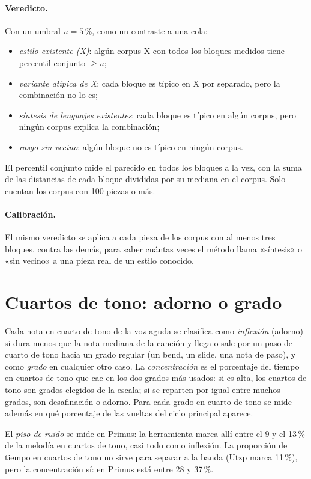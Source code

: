 \paragraph{Veredicto.} Con un umbral $u = 5$\,\%, como un contraste a una cola:
\begin{itemize}
  \item \emph{estilo existente (X)}: algún corpus X con todos los bloques medidos tiene percentil conjunto $\ge u$;
  \item \emph{variante atípica de X}: cada bloque es típico en X por separado, pero la combinación no lo es;
  \item \emph{síntesis de lenguajes existentes}: cada bloque es típico en algún corpus, pero ningún corpus explica la
  combinación;
  \item \emph{rasgo sin vecino}: algún bloque no es típico en ningún corpus.
\end{itemize}
El percentil conjunto mide el parecido en todos los bloques a la vez, con la suma de las distancias de cada bloque
divididas por su mediana en el corpus. Solo cuentan los corpus con 100 piezas o más.

\paragraph{Calibración.} El mismo veredicto se aplica a cada pieza de los corpus con al menos tres bloques, contra las
demás, para saber cuántas veces el método llama «síntesis» o «sin vecino» a una pieza real de un estilo conocido.

\section{Cuartos de tono: adorno o grado}\label{sec:metodo-cuartos}

Cada nota en cuarto de tono de la voz aguda se clasifica como \emph{inflexión} (adorno) si dura menos que la nota mediana
de la canción y llega o sale por un paso de cuarto de tono hacia un grado regular (un bend, un slide, una nota de paso), y
como \emph{grado} en cualquier otro caso. La \emph{concentración} es el porcentaje del tiempo en cuartos de tono que cae
en los dos grados más usados: si es alta, los cuartos de tono son grados elegidos de la escala; si se reparten por igual
entre muchos grados, son desafinación o adorno. Para cada grado en cuarto de tono se mide además en qué porcentaje de las
vueltas del ciclo principal aparece.

El \emph{piso de ruido} se mide en Primus: la herramienta marca allí entre el 9 y el 13\,\% de la melodía en cuartos de
tono, casi todo como inflexión. La proporción de tiempo en cuartos de tono no sirve para separar a la banda (Utzp marca
11\,\%), pero la concentración sí: en Primus está entre 28 y 37\,\%.

